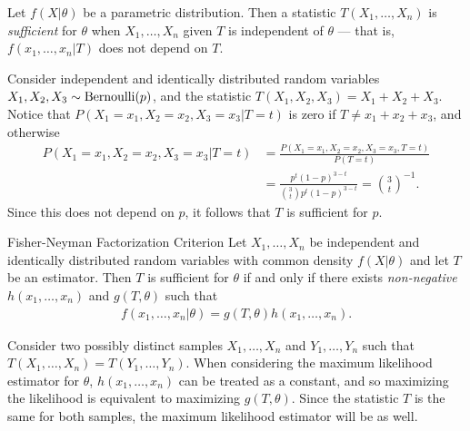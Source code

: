 \begin{defn}
    Let $f(X|\theta)$ be a parametric distribution. Then a statistic $T(X_1, \ldots, X_n)$ is \emph{sufficient} for $\theta$ when $X_1, \ldots, X_n$ given $T$ is independent of $\theta$ --- that is, $f(x_1, \ldots, x_n|T)$ does not depend on $T$.
\end{defn}

\begin{exmp}
    Consider independent and identically distributed random variables $X_1, X_2, X_3 \sim \textrm{Bernoulli}(p)$, and the statistic $T(X_1, X_2, X_3) = X_1 + X_2 + X_3$. Notice that $P(X_1=x_1, X_2=x_2, X_3=x_3|T=t)$ is zero if $T \neq x_1 + x_2 + x_3$, and otherwise
    \begin{align*}
        P(X_1=x_1, X_2=x_2, X_3=x_3|T=t) &= \frac{P(X_1=x_1, X_2=x_2, X_3=x_3,T=t)}{P(T=t)} \\
        &= \frac{p^{t}(1-p)^{3-t}}{\binom{3}{t}p^{t}(1-p)^{3-t}} = \binom{3}{t}^{-1}.
    \end{align*}
    Since this does not depend on $p$, it follows that $T$ is sufficient for $p$.
\end{exmp}

\begin{thm}{Fisher-Neyman Factorization Criterion}\label{sufficiency-factorization-fisher}\proofbreak
    Let $X_1, \ldots, X_n$ be independent and identically distributed random variables with common density $f(X|\theta)$ and let $T$ be an estimator. Then $T$ is sufficient for $\theta$ if and only if there exists \emph{non-negative} $h(x_1, \ldots, x_n)$ and $g(T, \theta)$ such that
    \begin{align*}
        f(x_1, \ldots, x_n|\theta) = g(T, \theta)h(x_1, \ldots, x_n).
    \end{align*}
\end{thm}

\begin{rmk}
    Consider two possibly distinct samples $X_1, \ldots, X_n$ and $Y_1, \ldots, Y_n$ such that $T(X_1, \ldots, X_n) = T(Y_1, \ldots, Y_n)$. When considering the maximum likelihood estimator for $\theta$, $h(x_1, \ldots, x_n)$ can be treated as a constant, and so maximizing the likelihood is equivalent to maximizing $g(T, \theta)$. Since the statistic $T$ is the same for both samples, the maximum likelihood estimator will be as well.
\end{rmk}

